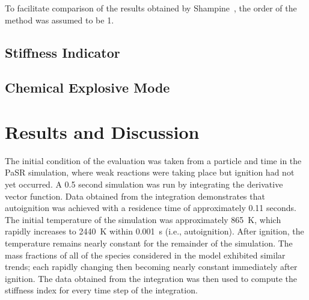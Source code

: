 \documentclass[12pt]{ussci}
\begin{document}
To facilitate comparison of the results obtained by Shampine~\cite{Shampine1985}, the order of the method was assumed to be 1.

\subsection{Stiffness Indicator}





\subsection{Chemical Explosive Mode}



\section{Results and Discussion}
%
The initial condition of the evaluation was taken from a particle and time in the PaSR simulation, where weak reactions were taking place but ignition had not yet occurred.
A 0.5 second simulation was run by integrating the derivative vector function.
Data obtained from the integration demonstrates that autoignition was achieved with a residence time of approximately 0.11 seconds.
The initial temperature of the simulation was approximately \SI{865}{\kelvin}, which rapidly increases to \SI{2440}{\kelvin} within \SI{0.001}{\second} (i.e., autoignition).
After ignition, the temperature remains nearly constant for the remainder of the simulation. The mass fractions of all of the species considered in the model exhibited similar trends; each rapidly changing then becoming nearly constant immediately after ignition.
The data obtained from the integration was then used to compute the stiffness index for every time step of the integration.
\end{document}
